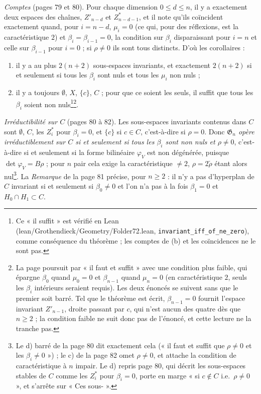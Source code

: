 \documentclass[11pt,a4paper]{article}
\begin{document}
\emph{Comptes} (pages 79 et 80). Pour chaque dimension $0 \leqslant d \leqslant
n$, il y a exactement deux espaces des chaînes, $Z'_{n-d}$ et $Z^*_{n-d-1}$, et
il note qu'ils coïncident exactement quand, pour $i = n - d$, $\mu_i = 0$ (ce qui,
pour des réflexions, est la caractéristique $2$) et $\beta_i = \beta_{i-1} = 0$,
la condition sur $\beta_i$ disparaissant pour $i = n$ et celle sur $\beta_{i-1}$
pour $i = 0$ ; si $\rho \neq 0$ ils sont tous distincts. D'où les corollaires :
\begin{enumerate}
  \item[(b)] il y a au plus $2(n+2)$ sous-espaces invariants, et exactement
    $2(n+2)$ si et seulement si tous les $\beta_i$ sont nuls et tous les $\mu_i$
    non nuls ;
  \item[(c)] il y a toujours $\emptyset$, $X$, $\{c\}$, $C$ ; pour que ce soient
    les seuls, il suffit que tous les $\beta_i$ soient non nuls\footnote{Ce
« il suffit » est vérifié en Lean (lean/Grothendieck/Geometry/Folder72.lean,
\texttt{invariant\_iff\_of\_ne\_zero}), comme conséquence du théorème ; les
comptes de (b) et les coïncidences ne le sont pas.}\footnote{La page
    poursuit par « il faut et suffit » avec une condition plus faible, qui
    épargne $\beta_0$ quand $\mu_0 = 0$ et $\beta_{n-1}$ quand $\mu_n = 0$ (en
    caractéristique $2$, seuls les $\beta_i$ intérieurs seraient requis). Les
    deux énoncés se suivent sans que le premier soit barré. Tel que le théorème
    est écrit, $\beta_{n-1} = 0$ fournit l'espace invariant $Z'_{n-1}$, droite
    passant par $c$, qui n'est aucun des quatre dès que $n \geqslant 2$ ; la
    condition faible ne suit donc pas de l'énoncé, et cette lecture ne la
    tranche pas.}.
\end{enumerate}

\emph{Irréductibilité sur $C$} (pages 80 à 82). Les sous-espaces invariants
contenus dans $C$ sont $\emptyset$, $C$, les $Z^*_i$ pour $\beta_i = 0$, et
$\{c\}$ si $c \in C$, c'est-à-dire si $\rho = 0$. Donc \emph{$\mathfrak{G}_n$
opère irréductiblement sur $C$ si et seulement si tous les $\beta_i$ sont non nuls
et $\rho \neq 0$}, c'est-à-dire si et seulement si la forme bilinéaire $\varphi_V$
est non dégénérée, puisque $\det \varphi_V = B\rho$ ; pour $n$ pair cela exige la
caractéristique $\neq 2$, $\rho = 2\tilde\rho$ étant alors nul\footnote{Le d)
barré de la page 80 dit exactement cela (« il faut et suffit que $\rho \neq 0$ et
les $\beta_i \neq 0$ ») ; le c) de la page 82 omet $\rho \neq 0$, et attache la
condition de caractéristique à $n$ impair. Le d) repris page 80, qui décrit les
sous-espaces stables de $C$ comme les $Z^*_i$ pour $\beta_i = 0$, porte en marge
« si $c \notin C$ i.e.\ $\rho \neq 0$ », et s'arrête sur « Ces sous- ».}. La
\emph{Remarque} de la page 81 précise, pour $n \geqslant 2$ : il n'y a pas
d'hyperplan de $C$ invariant si et seulement si $\beta_0 \neq 0$ et l'on n'a pas
à la fois $\beta_1 = 0$ et $H_0 \cap H_1 \subset C$.
\end{document}
